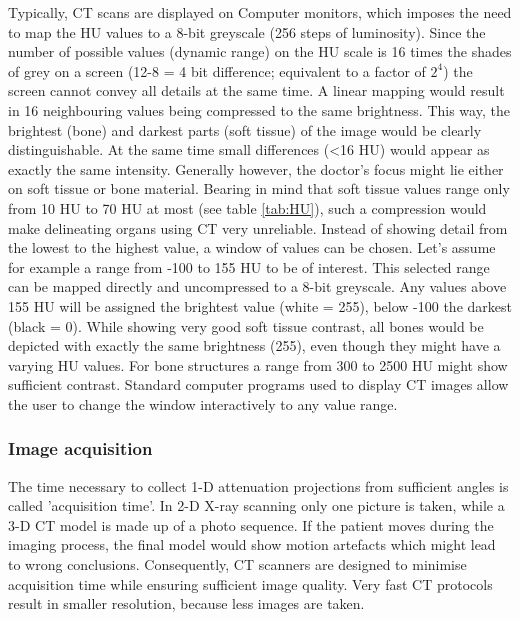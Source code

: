 Typically, CT scans are displayed on Computer monitors, which imposes the need to map the HU values to a 8-bit greyscale (256 steps of luminosity).
Since the number of possible values (dynamic range) on the HU scale is 16 times the shades of grey on a screen (12-8 = 4 bit difference; equivalent to a factor of $2^4$) the screen cannot convey all details at the same time.
A linear mapping would result in 16 neighbouring values being compressed to the same brightness.
This way, the brightest (bone) and darkest parts (soft tissue) of the image would be clearly distinguishable.
At the same time small differences (<16 HU) would appear as exactly the same intensity.
Generally however, the doctor's focus might lie either on soft tissue or bone material.
Bearing in mind that soft tissue values range only from 10 HU to 70 HU at most (see table \ref{tab:HU}), such a compression would make delineating organs using CT very unreliable.
Instead of showing detail from the lowest to the highest value, a window of values can be chosen.
Let's assume for example a range from -100 to 155 HU to be of interest.
This selected range can be mapped directly and uncompressed to a 8-bit greyscale.
Any values above 155 HU will be assigned the brightest value (white = 255), below -100 the darkest (black = 0).
While showing very good soft tissue contrast, all bones would be depicted with exactly the same brightness (255), even though they might have a varying HU values.
For bone structures a range from 300 to 2500 HU might show sufficient contrast.
Standard computer programs used to display CT images allow the user to change the window interactively to any value range. \cite{Podgorsak, Maidment2014}

\subsubsection{Image acquisition}
The time necessary to collect 1-D attenuation projections from sufficient angles is called 'acquisition time'.
In 2-D X-ray scanning only one picture is taken, while a 3-D CT model is made up of a photo sequence.
If the patient moves during the imaging process, the final model would show motion artefacts which might lead to wrong conclusions.
Consequently, CT scanners are designed to minimise acquisition time while ensuring sufficient image quality.
Very fast CT protocols result in smaller resolution, because less images are taken. \cite{Podgorsak, Maidment2014}


